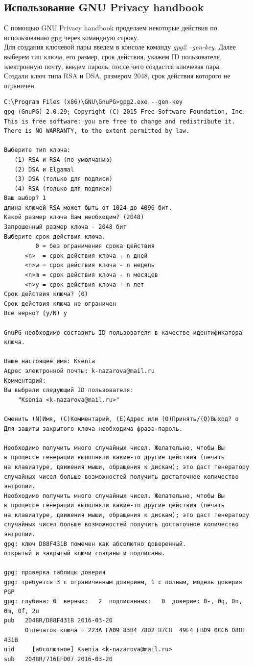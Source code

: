 \documentclass[10pt,a4paper]{report}
\begin{document}
\subsection{Использование GNU Privacy handbook}
С помощью GNU Privacy handbook проделаем некоторые действия по использованию gpg через командную строку. \\
Для создания ключевой пары введем в консоле команду \textit{gpg2 --gen-key}. Далее выберем тип ключа, его размер, срок действия, укажем ID пользователя, электронную почту, введем пароль, после чего создастся ключевая пара.  \\
Создали ключ типа RSA и DSA, размером 2048, срок действия которого не ограничен. \\
\begin{verbatim}
C:\Program Files (x86)\GNU\GnuPG>gpg2.exe --gen-key
gpg (GnuPG) 2.0.29; Copyright (C) 2015 Free Software Foundation, Inc.
This is free software: you are free to change and redistribute it.
There is NO WARRANTY, to the extent permitted by law.

Выберите тип ключа:
   (1) RSA и RSA (по умолчанию)
   (2) DSA и Elgamal
   (3) DSA (только для подписи)
   (4) RSA (только для подписи)
Ваш выбор? 1
длина ключей RSA может быть от 1024 до 4096 бит.
Какой размер ключа Вам необходим? (2048)
Запрошенный размер ключа - 2048 бит
Выберите срок действия ключа.
         0 = без ограничения срока действия
      <n>  = срок действия ключа - n дней
      <n>w = срок действия ключа - n недель
      <n>m = срок действия ключа - n месяцев
      <n>y = срок действия ключа - n лет
Срок действия ключа? (0)
Срок действия ключа не ограничен
Все верно? (y/N) y

GnuPG необходимо составить ID пользователя в качестве идентификатора ключа.

Ваше настоящее имя: Ksenia
Адрес электронной почты: k-nazarova@mail.ru
Комментарий:
Вы выбрали следующий ID пользователя:
    "Ksenia <k-nazarova@mail.ru>"

Сменить (N)Имя, (C)Комментарий, (E)Адрес или (O)Принять/(Q)Выход? o
Для защиты закрытого ключа необходима фраза-пароль.

Необходимо получить много случайных чисел. Желательно, чтобы Вы
в процессе генерации выполняли какие-то другие действия (печать
на клавиатуре, движения мыши, обращения к дискам); это даст генератору
случайных чисел больше возможностей получить достаточное количество энтропии.
Необходимо получить много случайных чисел. Желательно, чтобы Вы
в процессе генерации выполняли какие-то другие действия (печать
на клавиатуре, движения мыши, обращения к дискам); это даст генератору
случайных чисел больше возможностей получить достаточное количество энтропии.
gpg: ключ D88F431B помечен как абсолютно доверенный.
открытый и закрытый ключи созданы и подписаны.

gpg: проверка таблицы доверия
gpg: требуется 3 с ограниченным доверием, 1 с полным, модель доверия PGP
gpg: глубина: 0  верных:   2  подписанных:   0  доверие: 0-, 0q, 0n, 0m, 0f, 2u
pub   2048R/D88F431B 2016-03-20
      Отпечаток ключа = 223A FA09 83B4 78D2 B7CB  49E4 FBD9 0CC6 D88F 431B
uid     [абсолютное] Ksenia <k-nazarova@mail.ru>
sub   2048R/716EFD07 2016-03-20
\end{verbatim}
 
\end{document}
